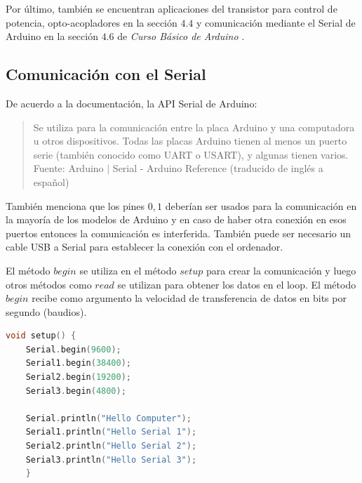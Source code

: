 \documentclass{article}
\begin{document}
    \bigbreak

    Por último, también se encuentran aplicaciones del transistor para control de potencia, opto-acopladores en la sección $4.4$ y comunicación mediante el Serial de Arduino en la sección $4.6$ de \textit{Curso Básico de Arduino} \cite{flores-2018}.

    \subsection{Comunicación con el Serial}

    De acuerdo a la documentación, la API Serial de Arduino:

    \begin{quote}
        Se utiliza para la comunicación entre la placa Arduino y una computadora u otros dispositivos. Todas las placas Arduino tienen al menos un puerto serie (también conocido como UART o USART), y algunas tienen varios.\\ \footnotesize
        Fuente: Arduino $\mid$ Serial - Arduino Reference (traducido de inglés a español) \cite{arduino-serial}
    \end{quote}

    También menciona que los pines $0,1$ deberían ser usados para la comunicación en la mayoría de los modelos de Arduino y en caso de haber otra conexión en esos puertos entonces la comunicación es interferida. También puede ser necesario un cable USB a Serial para establecer la conexión con el ordenador.

    \bigbreak

    El método $begin$ se utiliza en el método $setup$ para crear la comunicación y luego otros métodos como $read$ se utilizan para obtener los datos en el loop. El método $begin$ recibe como argumento la velocidad de transferencia de datos en bits por segundo (baudios).

    \bigbreak

    \begin{lstlisting}[language=C, caption=Uso de Serial en Arduino Mega con todos sus puertos Seriales. \footnotesize Fuente: Serial - Arduino Reference (begin) \cite{arduino-serial}]
    void setup() {
    Serial.begin(9600);
    Serial1.begin(38400);
    Serial2.begin(19200);
    Serial3.begin(4800);

    Serial.println("Hello Computer");
    Serial1.println("Hello Serial 1");
    Serial2.println("Hello Serial 2");
    Serial3.println("Hello Serial 3");
    }
\end{lstlisting}
\end{document}
